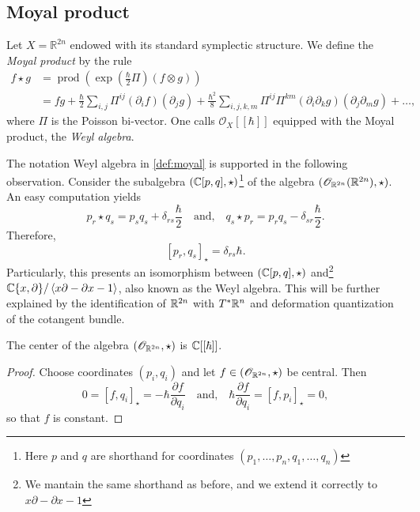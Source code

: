 \subsection{Moyal product}
\begin{definition}\label{def:moyal}
	Let $X = \mathbb{R}^{2n}$ endowed with its standard symplectic structure. We define the \textit{Moyal product} by the rule
    \begin{align}\label{eqn:weyl-moyal-free}
    	f \star g &= \operatorname{prod}\left(\exp \left(\frac{\hbar}{2}\Pi\right)(f \otimes g)\right) \\
    	&= fg + \frac{\hbar}{2}\sum_{i,j}\Pi^{ij}(\partial_{i}f)(\partial_{j}g) + \frac{\hbar^{2}}{8} \sum_{i,j,k,m} \Pi^{ij}\Pi^{km}(\partial_{i}\partial_{k}g)(\partial_{j}\partial_{m}g) + \ldots, \nonumber
    \end{align}
	where $\Pi$ is the Poisson bi-vector. One calls $\mathscr{O}_X[[\hbar]]$ equipped with the Moyal product, the \textit{Weyl algebra}.
\end{definition}
\begin{remark}\label{rem:weyl-algebra}
	The notation Weyl algebra in \cref{def:moyal} is supported in the following observation. Consider the subalgebra $({\mathbb C}[p,q], \star)$\footnote{Here $p$ and $q$ are shorthand for coordinates $(p_{1}, \ldots, p_{n}, q_{1}, \ldots, q_{n})$} of the algebra $(\mathscr{O}_{{\mathbb R}^{2n}}({\mathbb R}^{2n}), \star)$. An easy computation yields 
	\[
		p_{r} \star q_{s} = p_{s}q_{s} + \delta_{rs}\frac{\hbar}{2} \quad \text{and,} \quad q_{s} \star p_{r} = p_{r}q_{s} - \delta_{sr}\frac{\hbar}{2}.
	\]
	Therefore,
	\[
		[p_{r},q_{s}]_{\star} = \delta_{rs}\hbar.
	\]
	Particularly, this presents an isomorphism between $({\mathbb C}[p,q],\star)$ and\footnote{We mantain the same shorthand as before, and we extend it correctly to $x\partial - \partial x - 1$} ${\mathbb C}\{x,\partial\}/\left\langle x\partial - \partial x - 1\right\rangle$, also known as the Weyl algebra. This will be further explained by the identification of ${\mathbb R}^{2n}$ with $T^{*}{\mathbb R}^{n}$ and deformation quantization of the cotangent bundle.
\end{remark}
\begin{lemma}\label{lemm:center-weyl-algebra}
	The center of the algebra $(\mathscr{O}_{{\mathbb R}^{2n}}, \star)$ is ${\mathbb C}[[\hbar]]$. 
\end{lemma}
\begin{proof}
	Choose coordinates $(p_{i},q_{i})$ and let $f \in (\mathscr{O}_{{\mathbb R}^{2n}}, \star)$ be central. Then
	\[
		0 = [f,q_{i}]_{\star} = -\hbar\frac{\partial f}{\partial q_{i}}\quad \text{and,}\quad \hbar\frac{\partial f}{\partial q_{i}} = [f, p_{i}]_{\star} = 0,
	\]
	so that $f$ is constant. 
\end{proof}
